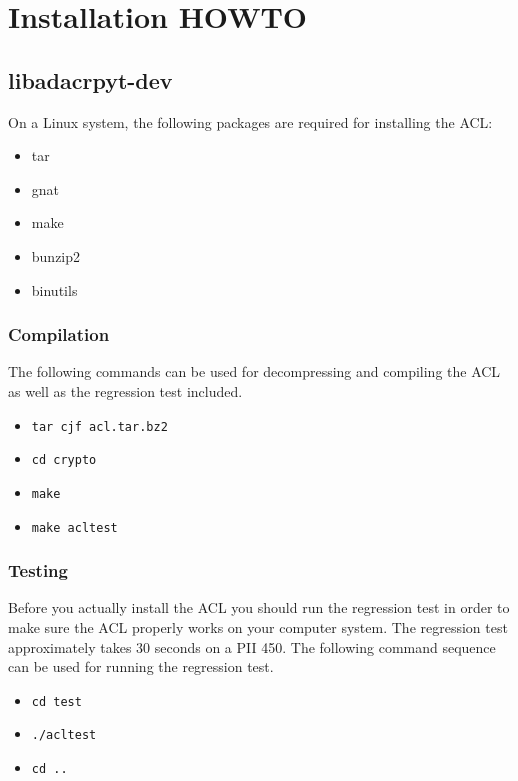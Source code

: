 
\section{Installation HOWTO}
\subsection{libadacrpyt-dev}
On a Linux system, the following packages are required for installing the ACL:
\begin{itemize}
\item tar 
\item gnat 
\item make
\item bunzip2 
\item binutils
\end{itemize}

\subsubsection{Compilation}
The following commands can be used for decompressing and compiling the ACL as 
well as the regression test included.
\begin{itemize}
\item \texttt{tar cjf acl.tar.bz2}
\item \texttt{cd crypto}
\item \texttt{make}
\item \texttt{make acltest}
\end{itemize}

\subsubsection{Testing}
Before you actually install the ACL you should run the regression test in
order to make sure the ACL properly works on your computer system. The
regression test approximately takes 30 seconds on a PII 450. The following
command sequence can be used for running the regression test.\\

\begin{itemize}
\item \texttt{cd test}
\item \texttt{./acltest}
\item \texttt{cd ..}
\end{itemize}

